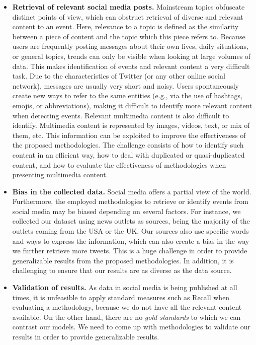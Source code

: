 \begin{itemize}
    \item {\bf Retrieval of relevant social media posts.} 
    Mainstream topics obfuscate distinct points of view, which can
    obstruct retrieval of diverse and relevant content to an event. 
    Here, relevance to a topic is defined as the similarity between a piece of
    content and the topic which this piece refers to.
    Because users are frequently posting messages about their own lives, daily
    situations, or general topics, trends can only be visible when looking at large
    volumes of data. 
    This makes identification of events and relevant content a very difficult task.
    Due to the characteristics of Twitter (or any other online social network),
    messages are usually very short and noisy.
    Users spontaneously create new ways to refer to the same entities
    (e.g., via the use of hashtags, emojis, or abbreviations), making it
    difficult to identify more relevant content when detecting events.
    Relevant multimedia content is also difficult to identify. 
    Multimedia content is represented by images, videos, text, or mix of them,
    etc. 
    This information can be exploited to improve the effectiveness of
    the proposed methodologies. 
    The challenge consists of how to identify such content in an efficient way,
    how to deal with duplicated or quasi-duplicated content, and how to evaluate
    the effectiveness of methodologies when presenting multimedia content. 

    \item {\bf Bias in the collected data.}
    Social media offers a partial view of the world. 
    Furthermore, the employed methodologies to retrieve or identify events from
    social media may be biased depending on several factors. 
    For instance, we collected our dataset using news outlets as sources, being
    the majority of the outlets coming from the USA or the UK. 
    Our sources also use specific words and ways to express the information,
    which can also create a bias in the way we further retrieve more tweets.
    This is a huge challenge in order to provide generalizable results from the
    proposed methodologies. 
    In addition, it is challenging to ensure that our results are as diverse as
    the data source. 

    \item {\bf Validation of results.} 
    As data in social media is being published at all times, it is unfeasible to
    apply standard measures such as Recall when evaluating a methodology,
    because we do not have all the relevant content available.
    On the other hand, there are no {\em gold standards} to which we can
    contrast our models. 
    We need to come up with methodologies to validate our results in order to
    provide generalizable results.

    
\end{itemize}


